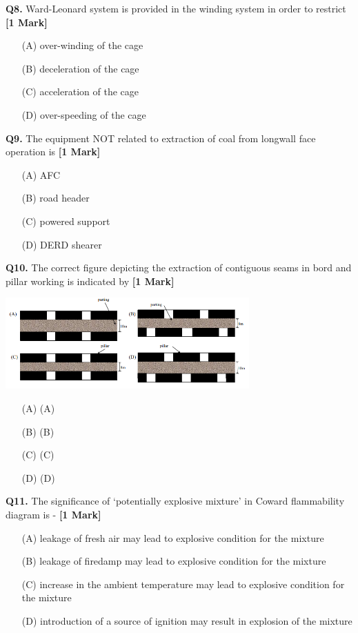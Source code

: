 \documentclass[11pt]{article}
\newcommand{\questiona}[2]{
    \noindent\textbf{Q#2.} #1 \hfill \textbf{[1 Mark]}
}
\begin{document}
\questiona{Ward-Leonard system is provided in the winding system in order to restrict}{8}
\begin{enumerate}
    \item[(A)] over-winding of the cage
    \item[(B)] deceleration of the cage
    \item[(C)] acceleration of the cage
    \item[(D)] over-speeding of the cage
\end{enumerate}
\vspace{0.5cm}

\questiona{The equipment NOT related to extraction of coal from longwall face operation is}{9}
\begin{enumerate}
    \item[(A)] AFC
    \item[(B)] road header
    \item[(C)] powered support
    \item[(D)] DERD shearer
\end{enumerate}
\vspace{0.5cm}

\questiona{The correct figure depicting the extraction of contiguous seams in bord and pillar working is indicated by}{10}
\begin{center}
\includegraphics[width=0.7\textwidth]{figures/10a.png}
\end{center}
\begin{enumerate}
    \item[(A)] (A)
    \item[(B)] (B)
    \item[(C)] (C)
    \item[(D)] (D)
\end{enumerate}
\vspace{0.5cm}

\questiona{The significance of ‘potentially explosive mixture’ in Coward flammability diagram is -}{11}
\begin{enumerate}
    \item[(A)] leakage of fresh air may lead to explosive condition for the mixture
    \item[(B)] leakage of firedamp may lead to explosive condition for the mixture
    \item[(C)] increase in the ambient temperature may lead to explosive condition for the mixture
    \item[(D)] introduction of a source of ignition may result in explosion of the mixture
\end{enumerate}
\vspace{0.5cm}
\end{document}
